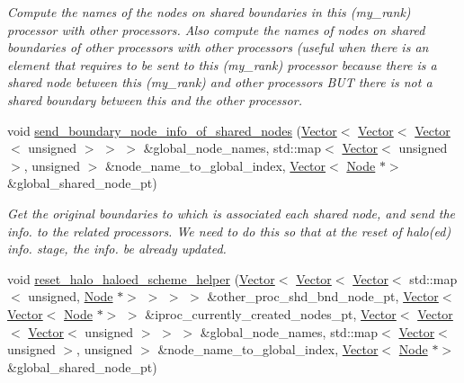 \begin{DoxyCompactItemize}
\begin{DoxyCompactList}\small\item\em Compute the names of the nodes on shared boundaries in this (my\+\_\+rank) processor with other processors. Also compute the names of nodes on shared boundaries of other processors with other processors (useful when there is an element that requires to be sent to this (my\+\_\+rank) processor because there is a shared node between this (my\+\_\+rank) and other processors B\+UT there is not a shared boundary between this and the other processor. \end{DoxyCompactList}\item 
void \hyperlink{classoomph_1_1RefineableTriangleMesh_a995a2a4b90565b3d53e06fdc2ed24be1}{send\+\_\+boundary\+\_\+node\+\_\+info\+\_\+of\+\_\+shared\+\_\+nodes} (\hyperlink{classoomph_1_1Vector}{Vector}$<$ \hyperlink{classoomph_1_1Vector}{Vector}$<$ \hyperlink{classoomph_1_1Vector}{Vector}$<$ unsigned $>$ $>$ $>$ \&global\+\_\+node\+\_\+names, std\+::map$<$ \hyperlink{classoomph_1_1Vector}{Vector}$<$ unsigned $>$, unsigned $>$ \&node\+\_\+name\+\_\+to\+\_\+global\+\_\+index, \hyperlink{classoomph_1_1Vector}{Vector}$<$ \hyperlink{classoomph_1_1Node}{Node} $\ast$$>$ \&global\+\_\+shared\+\_\+node\+\_\+pt)
\begin{DoxyCompactList}\small\item\em Get the original boundaries to which is associated each shared node, and send the info. to the related processors. We need to do this so that at the reset of halo(ed) info. stage, the info. be already updated. \end{DoxyCompactList}\item 
void \hyperlink{classoomph_1_1RefineableTriangleMesh_a604ab6d1fc1c54e1255845da75f8dc6d}{reset\+\_\+halo\+\_\+haloed\+\_\+scheme\+\_\+helper} (\hyperlink{classoomph_1_1Vector}{Vector}$<$ \hyperlink{classoomph_1_1Vector}{Vector}$<$ \hyperlink{classoomph_1_1Vector}{Vector}$<$ std\+::map$<$ unsigned, \hyperlink{classoomph_1_1Node}{Node} $\ast$$>$ $>$ $>$ $>$ \&other\+\_\+proc\+\_\+shd\+\_\+bnd\+\_\+node\+\_\+pt, \hyperlink{classoomph_1_1Vector}{Vector}$<$ \hyperlink{classoomph_1_1Vector}{Vector}$<$ \hyperlink{classoomph_1_1Node}{Node} $\ast$$>$ $>$ \&iproc\+\_\+currently\+\_\+created\+\_\+nodes\+\_\+pt, \hyperlink{classoomph_1_1Vector}{Vector}$<$ \hyperlink{classoomph_1_1Vector}{Vector}$<$ \hyperlink{classoomph_1_1Vector}{Vector}$<$ unsigned $>$ $>$ $>$ \&global\+\_\+node\+\_\+names, std\+::map$<$ \hyperlink{classoomph_1_1Vector}{Vector}$<$ unsigned $>$, unsigned $>$ \&node\+\_\+name\+\_\+to\+\_\+global\+\_\+index, \hyperlink{classoomph_1_1Vector}{Vector}$<$ \hyperlink{classoomph_1_1Node}{Node} $\ast$$>$ \&global\+\_\+shared\+\_\+node\+\_\+pt)

\end{DoxyCompactItemize}
